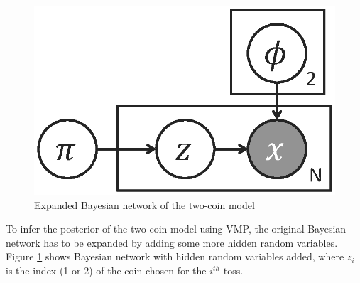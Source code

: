 \begin{figure}[ht]
	\centering
	\includegraphics[scale=0.4]{figs/two_coins_latent.eps}
	\caption{Expanded Bayesian network of the two-coin model}
	\label{fig:two_coin_bn}
\end{figure}

To infer the posterior of the two-coin model using VMP,
the original Bayesian network has to be expanded by 
adding some more hidden random variables.
Figure \ref{fig:two_coin_bn}
shows Bayesian network with hidden random variables added,
where $z_i$ is the index (1 or 2) of the coin chosen for the $i^{th}$ toss.


%

